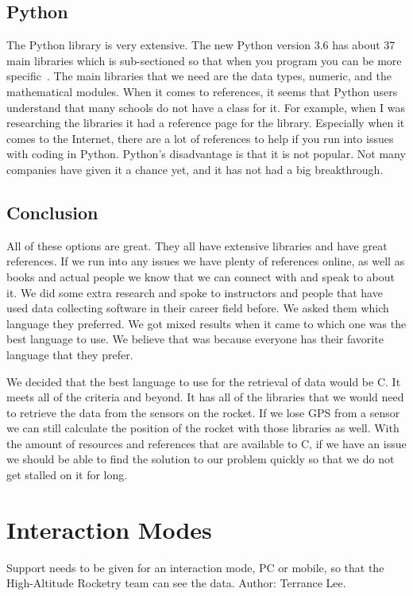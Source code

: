 \documentclass[10pt,draftclsnofoot,onecolumn]{IEEEtran}
\begin{document}
	\subsection{Python}
   	The Python library is very extensive. 
	The new Python version 3.6 has about 37 main libraries which is sub-sectioned so that when you program you can be more specific~\cite{the-python-standard-library}.
	The main libraries that we need are the data types, numeric, and the mathematical modules. 
	When it comes to references, it seems that Python users understand that many schools do not have a class for it. 
	For example, when I was researching the libraries it had a reference page for the library. 
	Especially when it comes to the Internet, there are a lot of references to help if you run into issues with coding in Python.
	Python's disadvantage is that it is not popular. 
	Not many companies have given it a chance yet, and it has not had a big breakthrough.  
  
   	
   	\subsection{Conclusion}
   	All of these options are great. They all have extensive libraries and have great references. 
	If we run into any issues we have plenty of references online, as well as books and actual people we know that we can connect
	with and speak to about it. 
	We did some extra research and spoke to instructors and people that have used data collecting software in their career field
	before. 
	We asked them which language they preferred. 
	We got mixed results when it came to which one was the best language to use. 
	We believe that was because everyone has their favorite language that they prefer. 
	
   	We decided that the best language to use for the retrieval of data would be C. 
	It meets all of the criteria and beyond. 
	It has all of the libraries that we would need to retrieve the data from the sensors on the rocket. 
	If we lose GPS from a sensor we can still calculate the position of the rocket with those libraries as well. 
	With the amount of resources and references that are available to C, if we have an issue we should be able to find the solution
	to our problem quickly so that we do not get stalled on it for long.  
    
    \section{Interaction Modes}
 	Support needs to be given for an interaction mode, PC or mobile, so that the High-Altitude Rocketry team can see the data. Author: Terrance Lee.
\end{document}
